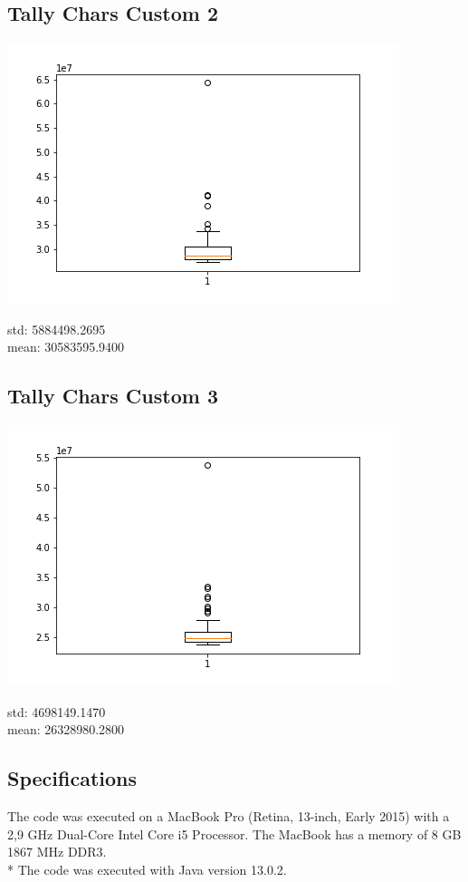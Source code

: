 \documentclass[a4paper,11pt]{article}
\theoremstyle{mytheor}
\begin{document}
\subsection*{Tally Chars Custom 2}
\includegraphics{assets/Tally_Chars_Custom_2.png}

\noindent std: 5884498.2695 \\
mean: 30583595.9400

\subsection*{Tally Chars Custom 3}
\includegraphics{assets/Tally_Chars_Custom_3.png}

\noindent std: 4698149.1470 \\
mean: 26328980.2800

\subsection*{Specifications}
The code was executed on a MacBook Pro (Retina, 13-inch, Early 2015) with a 2,9 GHz Dual-Core Intel Core i5 Processor. The MacBook has a memory of 8 GB 1867 MHz DDR3.\\*
The code was executed with Java version 13.0.2.
\end{document}
